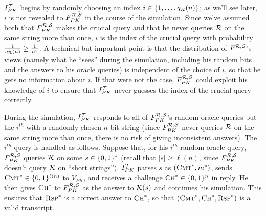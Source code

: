 $I_{PK}^{\mathcal{T}}$ begins 
by 
randomly choosing an index $i \in \{1,\ldots,q_{\mathcal{R}}(n)\}$; as we'll see later,
$i$ is not revealed to $F^{\mathcal{R},\mathcal{S}}_{PK}$ in the course of the simulation.  
Since we've assumed both that $F_{PK}^{\mathcal{R},\mathcal{S}}$ makes the crucial query
and that he never queries $\mathcal{R}$ on the same string more than once, $i$ is
the index of the crucial query with probability $\frac{1}{q_{\mathcal{R}}(n)} \geq
\frac{1}{n^c}$. A technical but important point is that the distribution of
$F^{\mathcal{R},\mathcal{S}}$'s views (namely what he ``sees'' during the simulation,
including his random bits and the answers to his oracle queries) is
independent of the choice of $i$, so that he gets no information about $i$. If
that were not the case, $F^{\mathcal{R},\mathcal{S}}_{PK}$ could exploit his knowledge of
$i$ to ensure that $I^{\mathcal{T}}_{PK}$ never guesses the index of the crucial query
correctly.

During the simulation, $I_{PK}^{\mathcal{T}}$ responds to all of
$F_{PK}^{\mathcal{R},\mathcal{S}}$'s random oracle queries but the $i^{th}$ with a
randomly chosen $n$-bit string (since $F_{PK}^{\mathcal{R},\mathcal{S}}$ never queries
$\mathcal{R}$ on the same string more than once, there is no risk of giving
inconsistent answers). The $i^{th}$ query is handled as follows.  Suppose
that, for his $i^{th}$ random oracle query, $F_{PK}^{\mathcal{R},\mathcal{S}}$ queries
$\mathcal{R}$ on some $s \in \{0,1\}^{*}$ (recall that $|s| \geq \ell(n)$, since
$F^{\mathcal{R},\mathcal{S}}_{PK}$ doesn't query $\mathcal{R}$ on ``short strings'').
$I_{PK}^{\mathcal{T}}$ parses $s$ as $(\textsc{Cmt}^*,m^*)$, sends $\textsc{Cmt}^*
\in \{0,1\}^{\ell(n)}$ to $V_{PK}$, and receives a challenge $\textsc{Ch}^* \in
\{0,1\}^{n}$ in reply.
He then gives $\textsc{Ch}^*$ to $F_{PK}^{\mathcal{R},\mathcal{S}}$ as the answer to
$\mathcal{R}(s)$ and continues his simulation. This ensures that $\textsc{Rsp}^*$ is
a correct answer to $\textsc{Ch}^*$, so that
$(\textsc{Cmt}^*,\textsc{Ch}^*,\textsc{Rsp}^*)$ is a valid transcript.

